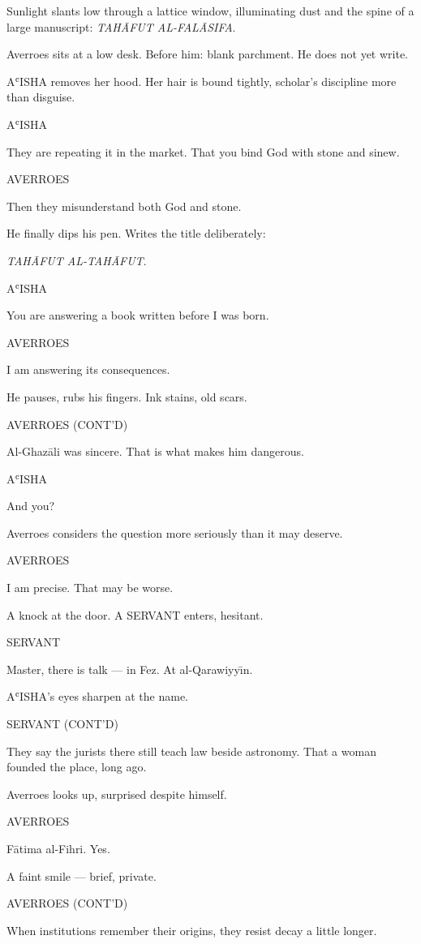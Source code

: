 \documentclass[12pt]{article}
\newlength{\charindent}
\newlength{\dialogueindent}
\newlength{\dialoguewidth}
\newcommand{\action}[1]{%
  \noindent#1\par\vspace{0.75em}%
}
\newcommand{\character}[1]{%
  \needspace{3\baselineskip}%
  \par\vspace{0.5em}%
  \noindent\hspace*{\charindent}\MakeUppercase{#1}\nopagebreak[4]%
}
\newcommand{\dialogue}[1]{%
  \par\nobreak\nopagebreak[4]%
  \noindent\hspace*{\dialogueindent}%
  \begin{minipage}[t]{\dialoguewidth}
  #1
  \end{minipage}%
  \par\vspace{0.5em}%
}
\newcommand{\contd}{\textsc{(cont'd)}}
\begin{document}
\action{Sunlight slants low through a lattice window, illuminating dust and the spine of a large manuscript: \textit{TAH\=AFUT AL-FAL\=ASIFA}.}

\action{Averroes sits at a low desk. Before him: blank parchment. He does not yet write.}

\action{AʿISHA removes her hood. Her hair is bound tightly, scholar’s discipline more than disguise.}

\character{AʿISHA}
\dialogue{They are repeating it in the market. That you bind God with stone and sinew.}

\character{AVERROES}
\dialogue{Then they misunderstand both God and stone.}

\action{He finally dips his pen. Writes the title deliberately:}

\action{\textit{TAH\=AFUT AL-TAH\=AFUT}.}

\character{AʿISHA}
\dialogue{You are answering a book written before I was born.}

\character{AVERROES}
\dialogue{I am answering its consequences.}

\action{He pauses, rubs his fingers. Ink stains, old scars.}

\character{AVERROES \contd}
\dialogue{Al-Ghaz\=ali was sincere. That is what makes him dangerous.}

\character{AʿISHA}
\dialogue{And you?}

\action{Averroes considers the question more seriously than it may deserve.}

\character{AVERROES}
\dialogue{I am precise. That may be worse.}

\action{A knock at the door. A SERVANT enters, hesitant.}

\character{SERVANT}
\dialogue{Master, there is talk — in Fez. At al-Qarawiyy\={\i}n.}

\action{AʿISHA’s eyes sharpen at the name.}

\character{SERVANT \contd}
\dialogue{They say the jurists there still teach law beside astronomy. That a woman founded the place, long ago.}

\action{Averroes looks up, surprised despite himself.}

\character{AVERROES}
\dialogue{F\=atima al-Fihri. Yes.}

\action{A faint smile — brief, private.}

\character{AVERROES \contd}
\dialogue{When institutions remember their origins, they resist decay a little longer.}
\end{document}
